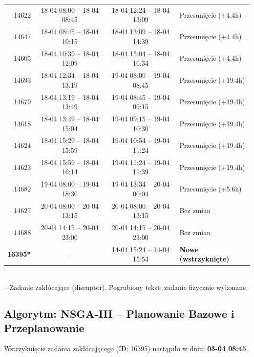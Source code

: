 \begin{table}[htbp]
\begin{tabular}{|r|c|c|l|}
14622 & 18-04 08:00 -- 18-04 08:45 & 18-04 12:24 -- 18-04 13:09 & Przesunięcie (+4.4h) \\ 
14647 & 18-04 08:45 -- 18-04 10:15 & 18-04 13:09 -- 18-04 14:39 & Przesunięcie (+4.4h) \\ 
14605 & 18-04 10:39 -- 18-04 12:09 & 18-04 15:04 -- 18-04 16:34 & Przesunięcie (+4.4h) \\ 
14693 & 18-04 12:34 -- 18-04 13:19 & 19-04 08:00 -- 19-04 08:45 & Przesunięcie (+19.4h) \\ 
14679 & 18-04 13:19 -- 18-04 13:49 & 19-04 08:45 -- 19-04 09:15 & Przesunięcie (+19.4h) \\ 
14618 & 18-04 13:49 -- 18-04 15:04 & 19-04 09:15 -- 19-04 10:30 & Przesunięcie (+19.4h) \\ 
14624 & 18-04 15:29 -- 18-04 15:59 & 19-04 10:54 -- 19-04 11:24 & Przesunięcie (+19.4h) \\ 
14623 & 18-04 15:59 -- 18-04 16:14 & 19-04 11:24 -- 19-04 11:39 & Przesunięcie (+19.4h) \\ 
14682 & 19-04 08:00 -- 19-04 18:30 & 19-04 13:34 -- 20-04 00:04 & Przesunięcie (+5.6h) \\ 
14627 & 20-04 08:00 -- 20-04 13:15 & 20-04 08:00 -- 20-04 13:15 & Bez zmian \\ 
14688 & 20-04 14:15 -- 20-04 23:00 & 20-04 14:15 -- 20-04 23:00 & Bez zmian \\ 
\hline
\textbf{16395*} & - & 14-04 15:24 -- 14-04 15:54 & \textbf{Nowe (wstrzyknięte)} \\ 
\hline
\end{tabular}
\\ {\footnotesize * -- Zadanie zakłócające (disruptor). Pogrubiony tekst: zadanie fizycznie wykonane.}
\end{table}

\vspace{0.8cm}
\subsection{Algorytm: NSGA-III -- Planowanie Bazowe i Przeplanowanie}

Wstrzyknięcie zadania zakłócającego (ID: 16395) nastąpiło w dniu: \textbf{03-04 08:45}.

